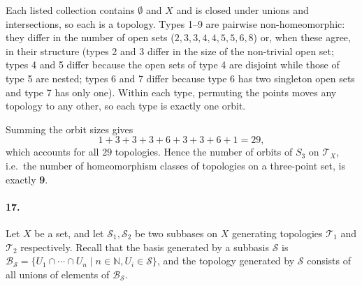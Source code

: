 \documentclass[12pt]{article}
\begin{document}
Each listed collection contains $\emptyset$ and $X$ and is closed under unions and intersections, so each is a topology. Types 1--9 are pairwise non-homeomorphic: they differ in the number of open sets ($2,3,3,4,4,5,5,6,8$) or, when these agree, in their structure (types 2 and 3 differ in the size of the non-trivial open set; types 4 and 5 differ because the open sets of type 4 are disjoint while those of type 5 are nested; types 6 and 7 differ because type 6 has two singleton open sets and type 7 has only one). Within each type, permuting the points moves any topology to any other, so each type is exactly one orbit.

Summing the orbit sizes gives
\[
1 + 3 + 3 + 3 + 6 + 3 + 3 + 6 + 1 = 29,
\]
which accounts for all $29$ topologies. Hence the number of orbits of $S_3$ on $\mathcal{T}_X$, i.e.\ the number of homeomorphism classes of topologies on a three-point set, is exactly \textbf{9}.

\paragraph{17.} Let $X$ be a set, and let $\mathcal{S}_1, \mathcal{S}_2$ be two subbases on $X$ generating topologies $\mathcal{T}_1$ and $\mathcal{T}_2$ respectively. Recall that the basis generated by a subbasis $\mathcal{S}$ is $\mathcal{B}_{\mathcal{S}} = \{ U_1\cap\cdots\cap U_n \mid n \in \mathbb{N}, U_i \in \mathcal{S} \}$, and the topology generated by $\mathcal{S}$ consists of all unions of elements of $\mathcal{B}_{\mathcal{S}}$.
\end{document}
